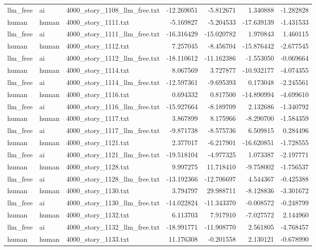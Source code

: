 \begin{longtable}{lllrrrr}
llm\_free & ai & 4000\_story\_1108\_llm\_free.txt & -12.269051 & -5.812671 & 1.340888 & -1.282828 \\
human & human & 4000\_story\_1111.txt & -5.169827 & -5.204533 & -17.639139 & -1.431533 \\
llm\_free & ai & 4000\_story\_1111\_llm\_free.txt & -16.316429 & -15.020782 & 1.970843 & 1.460115 \\
human & human & 4000\_story\_1112.txt & 7.257045 & -8.456704 & -15.876442 & -2.677545 \\
llm\_free & ai & 4000\_story\_1112\_llm\_free.txt & -18.110612 & -11.162386 & -1.553050 & -0.069664 \\
human & human & 4000\_story\_1114.txt & 8.067569 & 3.727877 & -10.932177 & -4.074355 \\
llm\_free & ai & 4000\_story\_1114\_llm\_free.txt & -12.597361 & -9.695393 & 0.173048 & -2.245561 \\
human & human & 4000\_story\_1116.txt & 0.694332 & 0.817500 & -14.890994 & -4.699610 \\
llm\_free & ai & 4000\_story\_1116\_llm\_free.txt & -15.927664 & -8.189709 & 2.132686 & -1.340792 \\
human & human & 4000\_story\_1117.txt & 3.867899 & 8.175966 & -8.290700 & -1.584359 \\
llm\_free & ai & 4000\_story\_1117\_llm\_free.txt & -9.871738 & -8.575736 & 6.509815 & 0.284496 \\
human & human & 4000\_story\_1121.txt & 2.377017 & -6.217901 & -16.620851 & -1.728555 \\
llm\_free & ai & 4000\_story\_1121\_llm\_free.txt & -19.518104 & -4.977325 & 1.073387 & -2.197771 \\
human & human & 4000\_story\_1128.txt & 9.997275 & 11.718410 & -9.758002 & -1.756537 \\
llm\_free & ai & 4000\_story\_1128\_llm\_free.txt & -13.192366 & -12.706697 & 4.544367 & -0.425388 \\
human & human & 4000\_story\_1130.txt & 3.794797 & 29.988711 & -8.128836 & -3.301672 \\
llm\_free & ai & 4000\_story\_1130\_llm\_free.txt & -14.022824 & -11.343370 & -0.008572 & -0.248799 \\
human & human & 4000\_story\_1132.txt & 6.113703 & 7.917910 & -7.027572 & 2.144960 \\
llm\_free & ai & 4000\_story\_1132\_llm\_free.txt & -18.991771 & -11.908770 & 2.561805 & -4.768457 \\
human & human & 4000\_story\_1133.txt & 11.176308 & -0.201558 & 2.130121 & -0.678990 \\

\end{longtable}
